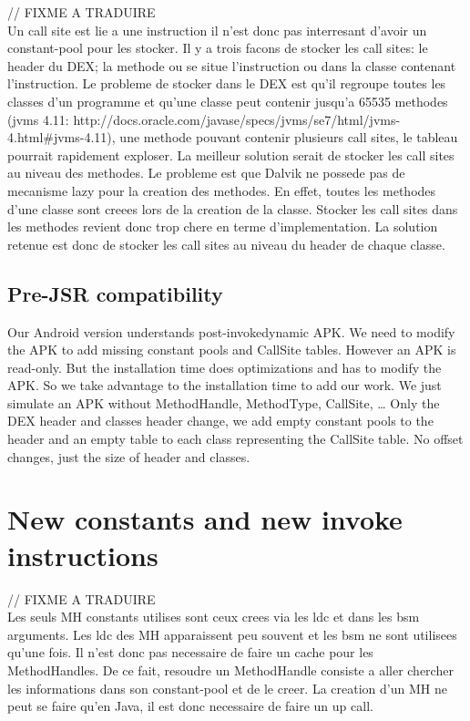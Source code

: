 \documentclass{sigplanconf}
\def \ANDROID{\mbox{Android}\xspace}
\newcommand{\fixme}[1]{{\color{red} // FIXME #1}\\}
\begin{document}
    \fixme{A TRADUIRE}
    Un call site est lie a une instruction il n'est donc pas interresant d'avoir un constant-pool pour les stocker.
    Il y a trois facons de stocker les call sites: le header du DEX; la methode ou se situe l'instruction ou dans la classe contenant l'instruction.
    Le probleme de stocker dans le DEX est qu'il regroupe toutes les classes d'un programme
    et qu'une classe peut contenir jusqu'a 65535 methodes (jvms 4.11: http://docs.oracle.com/javase/specs/jvms/se7/html/jvms-4.html\#jvms-4.11),
    une methode pouvant contenir plusieurs call sites, le tableau pourrait rapidement exploser.
    La meilleur solution serait de stocker les call sites au niveau des methodes.
    Le probleme est que Dalvik ne possede pas de mecanisme lazy pour la creation des methodes.
    En effet, toutes les methodes d'une classe sont creees lors de la creation de la classe.
    Stocker les call sites dans les methodes revient donc trop chere en terme d'implementation.
    La solution retenue est donc de stocker les call sites au niveau du header de chaque classe.

  \subsection{Pre-JSR compatibility}
    Our \ANDROID version understands post-invokedynamic APK.
    We need to modify the APK to add missing constant pools and CallSite tables.
    However an APK is read-only.
    But the installation time does optimizations and has to modify the APK.
    So we take advantage to the installation time to add our work.
    We just simulate an APK without MethodHandle, MethodType, CallSite, \dots
    Only the DEX header and classes header change, we add empty constant pools to the header
    and an empty table to each class representing the CallSite table.
    No offset changes, just the size of header and classes.

\section{New constants and new invoke instructions}

  \fixme{A TRADUIRE}
  Les seuls MH constants utilises sont ceux crees via les ldc et dans les bsm arguments.
  Les ldc des MH apparaissent peu souvent et les bsm ne sont utilisees qu'une fois.
  Il n'est donc pas necessaire de faire un cache pour les MethodHandles.
  De ce fait, resoudre un MethodHandle consiste a aller chercher les informations dans son constant-pool et de le creer.
  La creation d'un MH ne peut se faire qu'en Java, il est donc necessaire de faire un up call.
\end{document}
